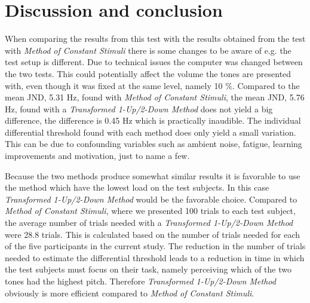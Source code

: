 \section*{Discussion and conclusion}
%
When comparing the results from this test with the results obtained from the test with \textit{Method of Constant Stimuli} there is some changes to be aware of e.g. the test setup is different. Due to technical issues the computer was changed between the two tests. This could potentially affect the volume the tones are presented with, even though it was fixed at the same level, namely 10 \%. \blankline
%
Compared to the mean JND, 5.31 Hz, found with \textit{Method of Constant Stimuli}, the mean JND, 5.76 Hz, found with a \textit{Transformed 1-Up/2-Down Method} does not yield a big difference, the difference is 0.45 Hz which is practically inaudible. The individual differential threshold found with each method does only yield a small variation. This can be due to confounding variables such as ambient noise, fatigue, learning improvements and motivation, just to name a few.  

Because the two methods produce somewhat similar results it is favorable to use the method which have the lowest load on the test subjects. In this case \textit{Transformed 1-Up/2-Down Method} would be the favorable choice. Compared to \textit{Method of Constant Stimuli}, where we presented 100 trials to each test subject, the average number of trials needed with a \textit{Transformed 1-Up/2-Down Method} were 28.8 trials. This is calculated based on the number of trials needed for each of the five participants in the current study. The reduction in the number of trials needed to estimate the differential threshold leads to a reduction in time in which the test subjects must focus on their task, namely perceiving which of the two tones had the highest pitch. Therefore \textit{Transformed 1-Up/2-Down Method} obviously is more efficient compared to \textit{Method of Constant Stimuli}.

